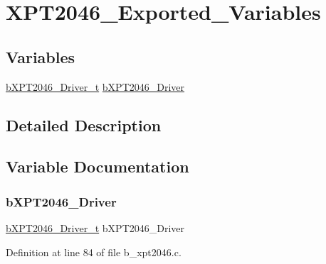 \hypertarget{group___x_p_t2046___exported___variables}{}\section{X\+P\+T2046\+\_\+\+Exported\+\_\+\+Variables}
\label{group___x_p_t2046___exported___variables}
\subsection*{Variables}
\begin{DoxyCompactItemize}
\item 
\mbox{\hyperlink{group___x_p_t2046___exported___types_definitions_ga9851b9956c106dac31a925346a103871}{b\+X\+P\+T2046\+\_\+\+Driver\+\_\+t}} \mbox{\hyperlink{group___x_p_t2046___exported___variables_ga2ed61e56408ad8fb94a4240811be42ff}{b\+X\+P\+T2046\+\_\+\+Driver}}
\end{DoxyCompactItemize}


\subsection{Detailed Description}


\subsection{Variable Documentation}
\mbox{\label{group___x_p_t2046___exported___variables_ga2ed61e56408ad8fb94a4240811be42ff}} 
\subsubsection{\texorpdfstring{b\+X\+P\+T2046\+\_\+\+Driver}{bXPT2046\_Driver}}
{\footnotesize\ttfamily \mbox{\hyperlink{group___x_p_t2046___exported___types_definitions_ga9851b9956c106dac31a925346a103871}{b\+X\+P\+T2046\+\_\+\+Driver\+\_\+t}} b\+X\+P\+T2046\+\_\+\+Driver}



Definition at line 84 of file b\+\_\+xpt2046.\+c.

